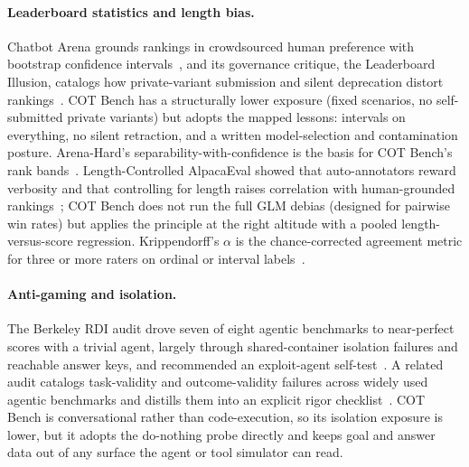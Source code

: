 \paragraph{Leaderboard statistics and length bias.} Chatbot Arena grounds rankings
in crowdsourced human preference with bootstrap confidence
intervals~\cite{chatbotarena2024}, and its governance critique, the Leaderboard
Illusion, catalogs how private-variant submission and silent deprecation distort
rankings~\cite{leaderboardillusion2025}. COT Bench has a structurally lower exposure
(fixed scenarios, no self-submitted private variants) but adopts the mapped lessons:
intervals on everything, no silent retraction, and a written model-selection and
contamination posture. Arena-Hard's separability-with-confidence is the basis for
COT Bench's rank bands~\cite{arenahard2024}. Length-Controlled AlpacaEval showed
that auto-annotators reward verbosity and that controlling for length raises
correlation with human-grounded rankings~\cite{lengthcontrolled2024}; COT Bench does
not run the full GLM debias (designed for pairwise win rates) but applies the
principle at the right altitude with a pooled length-versus-score regression.
Krippendorff's $\alpha$ is the chance-corrected agreement metric for three or more
raters on ordinal or interval labels~\cite{krippendorff2011}.

\paragraph{Anti-gaming and isolation.} The Berkeley RDI audit drove seven of eight
agentic benchmarks to near-perfect scores with a trivial agent, largely through
shared-container isolation failures and reachable answer keys, and recommended an
exploit-agent self-test~\cite{rdi2026}. A related audit catalogs task-validity and
outcome-validity failures across widely used agentic benchmarks and distills them
into an explicit rigor checklist~\cite{bestpractices2025}. COT Bench is
conversational rather than code-execution, so its isolation exposure is lower, but
it adopts the do-nothing probe directly and keeps goal and answer data out of any
surface the agent or tool simulator can read.

